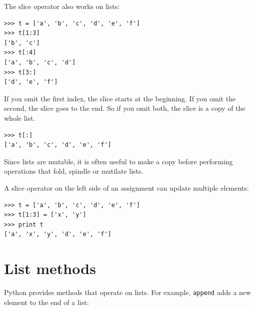 \documentclass[10pt]{book}
\begin{document}
\begin{CJK}{UTF8}{gbsn}
The slice operator also works on lists:

\begin{verbatim}
>>> t = ['a', 'b', 'c', 'd', 'e', 'f']
>>> t[1:3]
['b', 'c']
>>> t[:4]
['a', 'b', 'c', 'd']
>>> t[3:]
['d', 'e', 'f']
\end{verbatim}
%
If you omit the first index, the slice starts at the beginning.
If you omit the second, the slice goes to the end.  So if you
omit both, the slice is a copy of the whole list.

\begin{verbatim}
>>> t[:]
['a', 'b', 'c', 'd', 'e', 'f']
\end{verbatim}
%
Since lists are mutable, it is often useful to make a copy
before performing operations that fold, spindle or mutilate
lists.

A slice operator on the left side of an assignment
can update multiple elements:

\begin{verbatim}
>>> t = ['a', 'b', 'c', 'd', 'e', 'f']
>>> t[1:3] = ['x', 'y']
>>> print t
['a', 'x', 'y', 'd', 'e', 'f']
\end{verbatim}
%


%

%


\section{List methods}

Python provides methods that operate on lists.  For example,
{\tt append} adds a new element to the end of a list:


\end{CJK}
\end{document}
